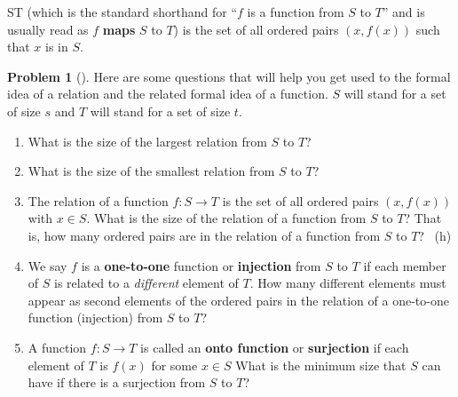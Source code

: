 \documentclass[10pt,]{book}
\newcommand{\terminology}[1]{\textbf{#1}}
\theoremstyle{plain}
\theoremstyle{definition}
\newtheorem{activity}[project]{Problem}
\theoremstyle{definition}
\numberwithin{equation}{chapter}
\begin{document}
S\rightarrow T\) (which is the standard shorthand for ``\(f\) is a function from \(S\) to \(T\)'' and is usually read as \(f\) \terminology{maps} \(S\) to \(T\)) is the set of all ordered pairs \((x,f(x))\) such that \(x\) is in \(S\).%
\begin{activity}[]\marginsymbol[-1em]{} \label{formalrelations}
\hypertarget{p-1847}{}%
Here are some questions that will help you get used to the formal idea of a relation and the related formal idea of a function. \(S\) will stand for a set of size \(s\) and \(T\) will stand for a set of size \(t\).%
\begin{enumerate}[font=\bfseries,label=(\alph*),ref=\alph*]
\item\label{task-235} \marginsymbol[-2.5em]{} \hypertarget{p-1848}{}%
What is the size of the largest relation from \(S\) to \(T\)?%
\item\label{task-236} \marginsymbol[-2.5em]{} \hypertarget{p-1850}{}%
What is the size of the smallest relation from \(S\) to \(T\)?%
\item\label{task-237} \marginsymbol[-2.5em]{} \hypertarget{p-1852}{}%
The relation of a function \(f:S\rightarrow T\) is the set of all ordered pairs \((x,f(x))\) with \(x\in S\).  What is the size of the relation of a function from \(S\) to \(T\)?  That is, how many ordered pairs are in the relation of a function from \(S\) to \(T\)?%
~{\tiny (h)}\item\label{task-238} \marginsymbol[-2.5em]{} \hypertarget{p-1855}{}%
We say \(f\) is a \terminology{one-to-one} function or \terminology{injection} from \(S\) to \(T\) if each member of \(S\) is related to a \emph{different} element of \(T\). How many different elements must appear as second elements of the ordered pairs in the relation of a one-to-one function (injection) from \(S\) to \(T\)?%
\item\label{onto} \marginsymbol[-2.5em]{} \hypertarget{p-1857}{}%
A function \(f:S\rightarrow T\) is called an \terminology{onto function} or \terminology{surjection} if each element of \(T\) is \(f(x)\) for some \(x\in S\) What is the minimum size that \(S\) can have if there is a  surjection from \(S\) to \(T\)?%
\end{enumerate}
\end{activity}
\end{document}
